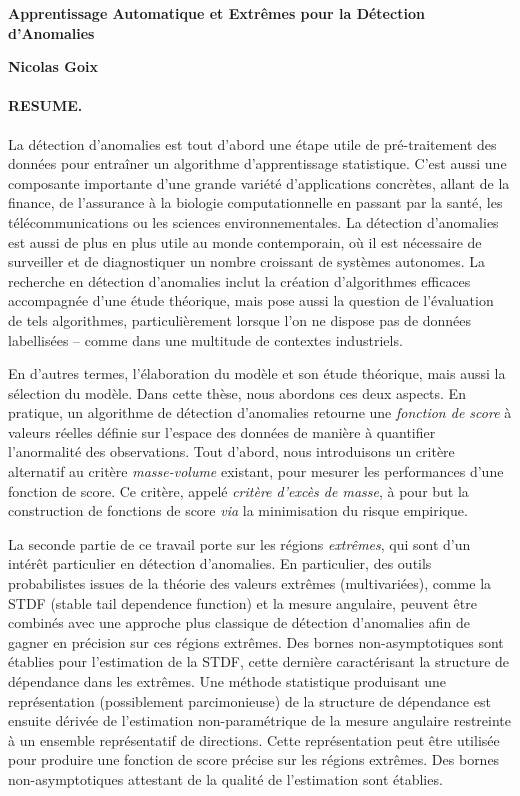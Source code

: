 \documentclass[a4paper, 8pt]{article}
\begin{document}
\begin{center}
{\large \textbf{Apprentissage Automatique et Extrêmes pour la Détection d'Anomalies\\}}
\vspace{0.5em}

\textbf{Nicolas Goix}
\end{center}



\paragraph{RESUME.}

La détection d'anomalies est tout d'abord une étape utile de pré-traitement des données pour entraîner un algorithme d'apprentissage statistique. C'est aussi une composante importante d'une grande variété d'applications concrètes, allant de la finance, de l'assurance à la biologie computationnelle en passant par la santé, les télécommunications ou les sciences environnementales. La détection d'anomalies est aussi de plus en plus utile au monde contemporain, où il est nécessaire de surveiller et de diagnostiquer un nombre croissant de systèmes autonomes. La recherche en détection d'anomalies inclut la création d'algorithmes efficaces accompagnée d'une étude théorique, mais pose aussi la question de l'évaluation de tels algorithmes, particulièrement lorsque l'on ne dispose pas de données labellisées -- comme dans une multitude de contextes industriels.

En d'autres termes, l'élaboration du modèle et son étude théorique, mais aussi la sélection du modèle. Dans cette thèse, nous abordons ces deux aspects. En pratique, un algorithme de détection d'anomalies retourne une \emph{fonction de score} à valeurs réelles définie sur l'espace des données de manière à quantifier l'anormalité des observations. Tout d'abord, nous introduisons un critère alternatif au critère \emph{masse-volume} existant, pour mesurer les performances d'une fonction de score. Ce critère, appelé \emph{critère d'excès de masse}, à pour but la construction de fonctions de score \emph{via} la minimisation du risque empirique.


La seconde partie de ce travail porte sur les régions \emph{extrêmes}, qui sont d'un intérêt particulier en détection d'anomalies. En particulier, des outils probabilistes issues de la théorie des valeurs extrêmes (multivariées), comme la STDF (stable tail dependence function) et la mesure angulaire, peuvent être combinés avec une approche plus classique de détection d'anomalies afin de gagner en précision sur ces régions extrêmes. Des bornes non-asymptotiques sont établies pour l'estimation de la STDF, cette dernière caractérisant la structure de dépendance dans les extrêmes. Une méthode statistique produisant une représentation (possiblement parcimonieuse) de la structure de dépendance est ensuite dérivée de l'estimation non-paramétrique de la mesure angulaire restreinte à un ensemble représentatif de directions. Cette représentation peut être utilisée pour produire une fonction de score précise sur les régions extrêmes. Des bornes non-asymptotiques attestant de la qualité de l'estimation sont établies.
\end{document}
